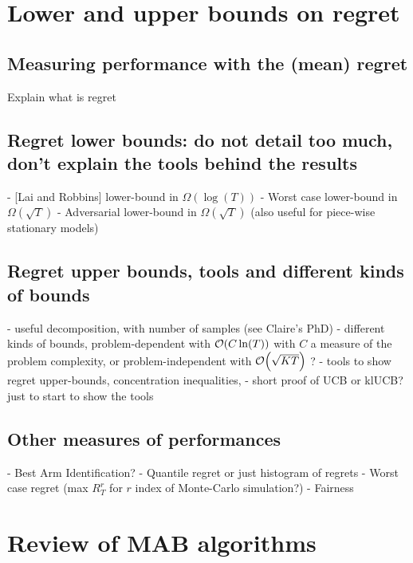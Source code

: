 \section{Lower and upper bounds on regret}
\label{sec:2:lowerUpperBoundsRegret}


\subsection{Measuring performance with the (mean) regret}

Explain what is regret


\subsection{Regret lower bounds: do not detail too much, don't explain the tools behind the results}

- [Lai and Robbins] lower-bound in $\Omega(\log(T))$
- Worst case lower-bound in $\Omega(\sqrt{T})$
- Adversarial lower-bound in $\Omega(\sqrt{T})$ (also useful for piece-wise stationary models)


\subsection{Regret upper bounds, tools and different kinds of bounds}

- useful decomposition, with number of samples (see Claire's PhD)
- different kinds of bounds, problem-dependent with $\mathop{}\mathopen{}\mathcal{O}\mathopen{}\left(C \ln(T)\right)$ with $C$ a measure of the problem complexity, or problem-independent with $\mathop{}\mathopen{}\mathcal{O}\mathopen{}\left(\sqrt{KT}\right)$ ?
- tools to show regret upper-bounds, concentration inequalities,
- short proof of UCB or klUCB? just to start to show the tools


\subsection{Other measures of performances}

- Best Arm Identification?
- Quantile regret or just histogram of regrets
- Worst case regret (max $R_T^{r}$ for $r$ index of Monte-Carlo simulation?)
- Fairness


\section{Review of MAB algorithms}
\label{sec:2:famousMABalgorithms}

